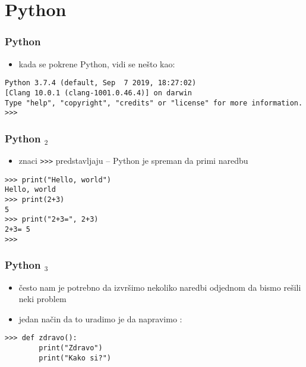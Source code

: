 \documentclass[utf8,compress]{beamer}
\begin{document}

\section{Python}

\begin{frame}[fragile,shrink=15]
\frametitle{Python}
\begin{itemize}
  \item kada se pokrene Python, vidi se nešto kao:
\end{itemize}
\begin{verbatim}
Python 3.7.4 (default, Sep  7 2019, 18:27:02) 
[Clang 10.0.1 (clang-1001.0.46.4)] on darwin
Type "help", "copyright", "credits" or "license" for more information.
>>>
\end{verbatim}
\end{frame}


\begin{frame}[fragile]
\frametitle{Python $_2$}
\begin{itemize}
  \item znaci \texttt{>}\texttt{>}\texttt{>} predstavljaju  -- Python je spreman da primi naredbu
\end{itemize}
\begin{verbatim}
>>> print("Hello, world")
Hello, world
>>> print(2+3)
5
>>> print("2+3=", 2+3)
2+3= 5
>>>
\end{verbatim}
\end{frame}

\begin{frame}[fragile]
\frametitle{Python $_3$}
\begin{itemize}
  \item često nam je potrebno da izvršimo nekoliko naredbi odjednom da bismo rešili neki problem
  \item jedan način da to uradimo je da napravimo :
\end{itemize}
\begin{verbatim}
>>> def zdravo():
        print("Zdravo")
        print("Kako si?")
\end{verbatim}
\end{frame}
\end{document}
